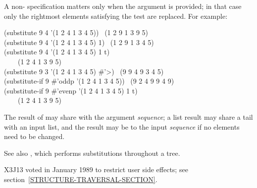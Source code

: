 \begin{defun}[Function]
A non-{\false}  specification
matters only when the  argument
is provided; in that case only the rightmost  elements satisfying
the test are replaced.
For example:
\begin{lisp}
(substitute 9 4 '(1 2 4 1 3 4 5)) \EV\ (1 2 9 1 3 9 5) \\
(substitute 9 4 '(1 2 4 1 3 4 5)  1) \EV\ (1 2 9 1 3 4 5) \\
(substitute 9 4 '(1 2 4 1 3 4 5)  1  t) \\
~~~\EV\ (1 2 4 1 3 9 5) \\
(substitute 9 3 '(1 2 4 1 3 4 5)  \#'>) \EV\ (9 9 4 9 3 4 5) \\
(substitute-if 9 \#'oddp '(1 2 4 1 3 4 5)) \EV\ (9 2 4 9 9 4 9) \\
(substitute-if 9 \#'evenp '(1 2 4 1 3 4 5)  1  t) \\
~~~\EV\ (1 2 4 1 3 9 5)
\end{lisp}
The result of  may share
with the argument \emph{sequence}; a list result may share a tail
with an input list, and the result may be  to the input \emph{sequence}
if no elements need to be changed.

See also , which performs substitutions throughout a tree.

\begin{new}
X3J13 voted in January 1989
to restrict user side effects; see section~\ref{STRUCTURE-TRAVERSAL-SECTION}.
\end{new}
\end{defun}

